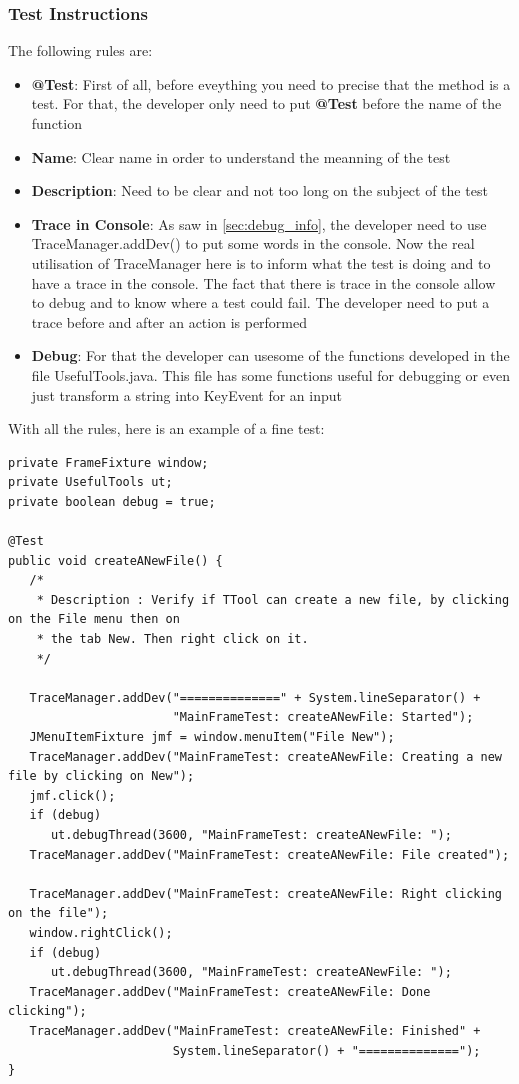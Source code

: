 \documentclass[12pt]{article}
\begin{document}
\subsubsection{Test Instructions}
The following rules are:

\begin{itemize}
  \item \textbf{@Test}: First of all, before eveything you need to precise that the method is a test. For that, the developer only need to put \textbf{@Test} before the name of the function
  \item \textbf{Name}: Clear name in order to understand the meanning of the test
  \item \textbf{Description}: Need to be clear and not too long on the subject of the test
  \item \textbf{Trace in Console}: As saw in \ref{sec:debug_info}, the developer need to use TraceManager.addDev() to put some words in the console. Now the real utilisation of TraceManager here is to inform what the test is doing and to have a trace in the console. The fact that there is trace in the console allow to debug and to know where a test could fail.\newline
The developer need to put a trace before and after an action is performed
  \item \textbf{Debug}: For that the developer can usesome of the functions developed in the file UsefulTools.java. This file has some functions useful for debugging or even just transform a string into KeyEvent for an input
\end{itemize}

With all the rules, here is an example of a fine test:
\begin{verbatim}
private FrameFixture window;
private UsefulTools ut;
private boolean debug = true;

@Test
public void createANewFile() {
   /*
    * Description : Verify if TTool can create a new file, by clicking on the File menu then on
    * the tab New. Then right click on it.
    */

   TraceManager.addDev("==============" + System.lineSeparator() +
                       "MainFrameTest: createANewFile: Started");
   JMenuItemFixture jmf = window.menuItem("File New");
   TraceManager.addDev("MainFrameTest: createANewFile: Creating a new file by clicking on New");
   jmf.click();
   if (debug)
      ut.debugThread(3600, "MainFrameTest: createANewFile: ");
   TraceManager.addDev("MainFrameTest: createANewFile: File created");
		
   TraceManager.addDev("MainFrameTest: createANewFile: Right clicking on the file");
   window.rightClick();
   if (debug)
      ut.debugThread(3600, "MainFrameTest: createANewFile: ");
   TraceManager.addDev("MainFrameTest: createANewFile: Done clicking");
   TraceManager.addDev("MainFrameTest: createANewFile: Finished" + 
                       System.lineSeparator() + "==============");
}
\end{verbatim}
\end{document}
